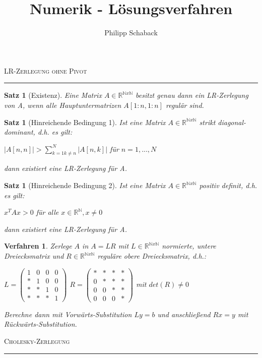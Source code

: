 \documentclass[a4paper]{article}
\author{Philipp Schaback}
\title{Numerik - Lösungsverfahren}
\newcounter{Sec}
\theoremstyle{marginbreak}
\newtheorem{satz}[definition]{Satz}
\newtheorem{verfahren}[definition]{Verfahren}
\newcommand{\sep}{%
	\rule{\textwidth}{0.3pt}%
	\stepcounter{Sec}%
}
\begin{document}
	\textsc{LR-Zerlegung ohne Pivot}
	\sep
	\begin{satz}[Existenz]
		Eine Matrix $A \in \mathbb{R}^{\mathbb{N}x\mathbb{N}} $ besitzt genau dann ein LR-Zerlegung von A, wenn alle Hauptuntermatrizen $A[1:n,1:n]$ regulär sind.
	\end{satz}
	\begin{satz}[Hinreichende Bedingung 1]
		Ist eine Matrix $A \in \mathbb{R}^{\mathbb{N}x\mathbb{N}} $ strikt diagonal-dominant, d.h. es gilt:
		\begin{description}
			\item $ |A[n,n]| > \sum_{k=1 k\ne n}^{N} |A[n,k]|$ für $n=1,...,N$
		\end{description}
		dann existiert eine LR-Zerlegung für A.
	\end{satz}
	\begin{satz}[Hinreichende Bedingung 2]
		Ist eine Matrix $A \in \mathbb{R}^{\mathbb{N}x\mathbb{N}} $ positiv definit, d.h. es gilt:
		\begin{description}
			\item $ x^TAx > 0 $ für alle $ x \in \mathbb{R}^\mathbb{N},x \ne 0$
		\end{description}
		dann existiert eine LR-Zerlegung für A.
	\end{satz}
	\begin{verfahren}
		Zerlege $A$ in $A=LR$ mit $ L \in \mathbb{R}^{\mathbb{N}x\mathbb{N}}$ normierte, untere Dreiecksmatrix und $ R \in \mathbb{R}^{\mathbb{N}x\mathbb{N}}$ reguläre obere Dreiecksmatrix, d.h.:
		\begin{description}
			\item $ L =
			\begin{pmatrix}
				1 & 0 & 0 & 0 \\
				* & 1 & 0 & 0 \\
				* & * & 1 & 0 \\
				* & * & * & 1
			\end{pmatrix}
			$\space
			$
			R = 
			\begin{pmatrix}
			* & * & * & * \\
			0 & * & * & * \\
			0 & 0 & * & * \\
			0 & 0 & 0 & *
			\end{pmatrix}
			$ mit $det(R) \ne 0$
		\end{description}
		Berechne dann mit Vorwärts-Substitution $ Ly = b$ und anschließend $ Rx = y$ mit Rückwärts-Substitution.
	\end{verfahren}
	\textsc{Cholesky-Zerlegung}
	\sep
	
\end{document}
